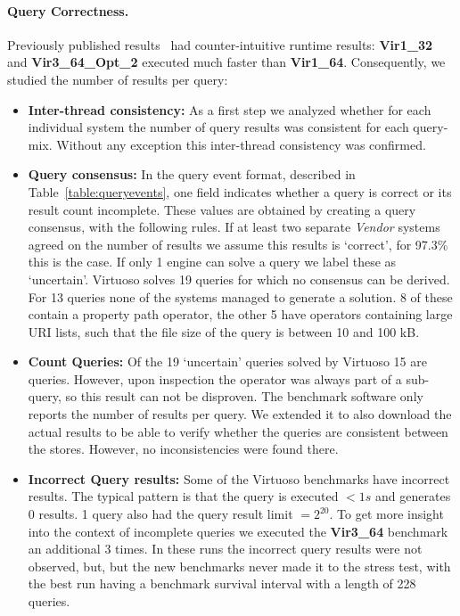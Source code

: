  
\paragraph{Query Correctness.}

Previously published results~\cite{dewitte_swat4ls_2016} had counter-intuitive runtime results:  \textbf{ Vir1\_32} and \textbf{Vir3\_64\_Opt\_2} executed much faster than \textbf{Vir1\_64}. 
Consequently, we studied the number of results per query:

 
\begin{itemize}
	\item \textbf{Inter-thread consistency:} As a first step we analyzed whether for each individual system the number of query results was consistent for each query-mix. 
	Without any exception this inter-thread consistency was confirmed.
	
	\item \textbf{Query consensus:} In the query event format, described in Table~\ref{table:queryevents}, one field indicates whether a query is correct or its result count incomplete. These values are obtained by creating a query consensus, with the following rules. If at least two separate \emph{Vendor} systems agreed on the number of results we assume this results is `correct', for 97.3\% this is the case. If only 1 engine can solve a query we label these as `uncertain'. Virtuoso solves 19 queries for which no consensus can be derived. For 13 queries none of the systems managed to generate a solution. 8 of these contain a property path operator, the other 5 have  operators containing large URI lists, such that the file size of the query is between 10 and 100 kB.
	
	\item \textbf{Count Queries:} Of the 19 `uncertain' queries solved by Virtuoso 15 are  queries. However, upon inspection the  operator was always part of a sub-query, so this result can not be disproven. The benchmark software only reports the number of results per query. We extended it to also download the actual results to be able to verify whether the  queries are consistent between the stores. However, no inconsistencies were found there.
	
	\item \textbf{Incorrect Query results:} Some of the Virtuoso benchmarks have incorrect results. The typical pattern is that the query is executed $< 1s$ and generates 0 results. 1 query also had the query result limit $ = 2^{20}$. To get more insight into the context of incomplete queries we executed the \textbf{Vir3\_64} benchmark an additional 3 times. In these runs the incorrect query results were not observed, but, but the new benchmarks never made it to the stress test, with the best run having a benchmark survival interval with a length of 228 queries.
\end{itemize}




